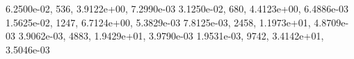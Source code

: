 6.2500e-02,   536, 3.9122e+00, 7.2990e-03 
3.1250e-02,   680, 4.4123e+00, 6.4886e-03 
1.5625e-02,  1247, 6.7124e+00, 5.3829e-03 
7.8125e-03,  2458, 1.1973e+01, 4.8709e-03 
3.9062e-03,  4883, 1.9429e+01, 3.9790e-03 
1.9531e-03,  9742, 3.4142e+01, 3.5046e-03 
